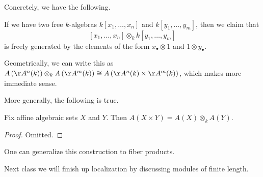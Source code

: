 Concretely, we have the following.
\begin{exe}
	If we have two free $k$-algebras $k[x_1,\ldots,x_n]$ and $k[y_1,\ldots,y_m]$, then we claim that
	\[[x_1,\ldots,x_n]\otimes_kk[y_1,\ldots,y_m]\]
	is freely generated by the elements of the form $x_\bullet\otimes1$ and $1\otimes y_\bullet$.
\end{exe}
\begin{remark}
	Geometrically, we can write this as $A\left(\AA^n(k)\right)\otimes_kA\left(\AA^m(k)\right)\cong A\left(\AA^n(k)\times\AA^m(k)\right)$, which makes more immediate sense.
\end{remark}
More generally, the following is true.
\begin{proposition}
	Fix affine algebraic sets $X$ and $Y$. Then $A(X\times Y)=A(X)\otimes_kA(Y)$.
\end{proposition}
\begin{proof}
	Omitted.
\end{proof}
\begin{remark}
	One can generalize this construction to fiber products.
\end{remark}
Next class we will finish up localization by discussing modules of finite length.
